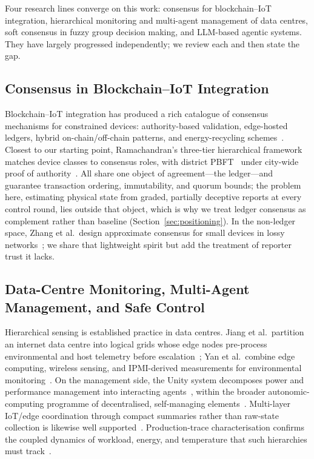 \documentclass[preprint,11pt]{elsarticle}
\begin{document}
Four research lines converge on this work: consensus for blockchain--IoT
integration, hierarchical monitoring and multi-agent management of data
centres, soft consensus in fuzzy group decision making, and LLM-based
agentic systems. They have largely progressed independently; we review
each and then state the gap.

\subsection{Consensus in Blockchain--IoT Integration}
\label{sec:related_blockchain}

Blockchain--IoT integration has produced a rich catalogue of consensus
mechanisms for constrained devices: authority-based validation,
edge-hosted ledgers, hybrid on-chain/off-chain patterns, and
energy-recycling schemes~\cite{khan2018,reyna2018,novo2018,
pan2019edgechain,tuli2019fogbus,qu2021pofl,haque2024}. Closest to our
starting point, Ramachandran's three-tier hierarchical framework matches
device classes to consensus roles, with district PBFT~\cite{castro1999}
under city-wide proof of authority~\cite{ramachandran2026}. All share one
object of agreement---the ledger---and guarantee transaction ordering,
immutability, and quorum bounds; the problem here, estimating physical
state from graded, partially deceptive reports at every control round,
lies outside that object, which is why we treat ledger consensus as
complement rather than baseline (Section~\ref{sec:positioning}). In the
non-ledger space, Zhang et al.\ design approximate consensus for small
devices in lossy networks~\cite{zhang2021approx}; we share that
lightweight spirit but add the treatment of reporter trust it lacks.

\subsection{Data-Centre Monitoring, Multi-Agent Management, and Safe
Control}
\label{sec:related_dc}

Hierarchical sensing is established practice in data centres. Jiang et
al.\ partition an internet data centre into logical grids whose edge
nodes pre-process environmental and host telemetry before
escalation~\cite{jiang2019}; Yan et al.\ combine edge computing,
wireless sensing, and IPMI-derived measurements for environmental
monitoring~\cite{yan2021}. On the management side, the Unity system
decomposes power and performance management into interacting
agents~\cite{das2008}, within the broader autonomic-computing programme
of decentralised, self-managing elements~\cite{tesauro2004}. Multi-layer
IoT/edge coordination through compact summaries rather than raw-state
collection is likewise well supported~\cite{ogino2018,nezami2021}.
Production-trace characterisation confirms the coupled dynamics of
workload, energy, and temperature that such hierarchies must
track~\cite{ilager2023}.
\end{document}
